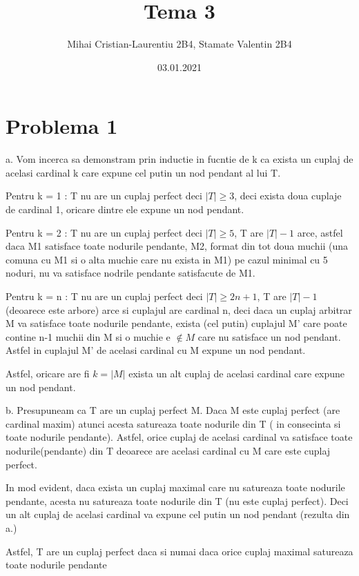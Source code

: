 \documentclass[11pt,leqno]{article}
\title{Tema 3}
\author{Mihai Cristian-Laurentiu 2B4, Stamate Valentin 2B4}
\date{03.01.2021}
\begin{document}
\maketitle

\section*{Problema 1}
a. Vom incerca sa demonstram prin inductie in fucntie de k ca exista un cuplaj de acelasi cardinal k care expune cel putin un nod pendant al lui T.

Pentru k = 1 : T nu are un cuplaj perfect deci $|T| \geq 3$, deci exista doua cuplaje de cardinal 1, oricare dintre ele expune un nod pendant.

Pentru k = 2 : T nu are un cuplaj perfect deci $|T| \geq 5$, T are $|T|-1$ arce, astfel daca M1 satisface toate nodurile pendante, M2, format din tot doua muchii (una comuna cu M1 si o alta muchie care nu exista in M1) pe cazul minimal cu 5 noduri, nu va satisface nodrile pendante satisfacute de M1.

Pentru k = n : T nu are un cuplaj perfect deci $|T| \geq 2n+1$, T are $|T|-1$ (deoarece este arbore) arce si cuplajul are cardinal n, deci daca un cuplaj arbitrar M va satisface toate nodurile pendante, exista (cel putin) cuplajul M' care poate contine n-1 muchii din M si o muchie e $\notin M$ care nu satisface un nod pendant. Astfel in cuplajul M' de acelasi cardinal cu M expune un nod pendant.

Astfel, oricare are fi $k=|M|$ exista un alt cuplaj de acelasi cardinal care expune un nod pendant.

b. Presupuneam ca T are un cuplaj perfect M. Daca M este cuplaj perfect (are cardinal maxim) atunci acesta satureaza toate nodurile din T ( in consecinta si toate nodurile pendante). Astfel, orice cuplaj de acelasi cardinal va satisface toate nodurile(pendante) din T deoarece are acelasi cardinal cu M care este cuplaj perfect.

In mod evident, daca exista un cuplaj maximal care nu satureaza toate nodurile pendante, acesta nu satureaza toate nodurile din T (nu este cuplaj perfect). Deci un alt cuplaj de acelasi cardinal va expune cel putin un nod pendant (rezulta din a.)

Astfel, T are un cuplaj perfect daca si numai daca orice cuplaj maximal satureaza toate nodurile pendante
\end{document}
